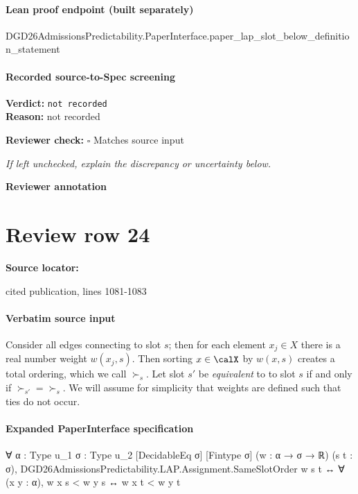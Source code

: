 \documentclass[10pt]{article}
\newcommand{\reviewerbox}{%
  \par\noindent\fbox{\parbox{0.96\linewidth}{\rule{0pt}{0.38in}}}\par
}
\newcommand{\reviewmatch}[1]{%
  \par\noindent\textbf{Reviewer check:} $\square$\; #1\par
  \noindent\emph{If left unchecked, explain the discrepancy or uncertainty below.}\par
}
\begin{document}
\paragraph{Lean proof endpoint (built separately)}\begin{ReviewVerbatim}
DGD26AdmissionsPredictability.PaperInterface.paper_lap_slot_below_definition_statement
\end{ReviewVerbatim}

\paragraph{Recorded source-to-Spec screening}
\textbf{Verdict:} \texttt{not recorded}
\\
\textbf{Reason:} not recorded
\reviewmatch{Matches source input}
\noindent\textbf{Reviewer annotation}\par
\reviewerbox
\clearpage
\hypertarget{source-claim-ac931f819ad35103}{}
\section*{Review row 24}
\textbf{Source locator:} {\footnotesize\raggedright cited publication, lines 1081-\allowbreak{}1083\par}
\paragraph{Verbatim source input}
\begin{ReviewVerbatim}
Consider all edges connecting to slot $s$; then for each element  $x_j \in X$ there is a real number weight $w(x_j, s)$. Then sorting $x \in \calX$ by $w(x,s)$ creates a total ordering, which we call $\succ_s$. Let slot $s'$ be \textit{equivalent} to
to slot $s$ if and only if $\succ_{s'} = \succ_{s}$.
We will assume for simplicity that weights are defined such that ties do not occur.
\end{ReviewVerbatim}


\paragraph{Expanded PaperInterface specification}
\begin{ReviewVerbatim}
∀ {α : Type u_1} {σ : Type u_2} [DecidableEq σ] [Fintype σ] (w : α → σ → ℝ) (s t : σ),
  DGD26AdmissionsPredictability.LAP.Assignment.SameSlotOrder w s t ↔ ∀ (x y : α), w x s < w y s ↔ w x t < w y t
\end{ReviewVerbatim}
\end{document}
